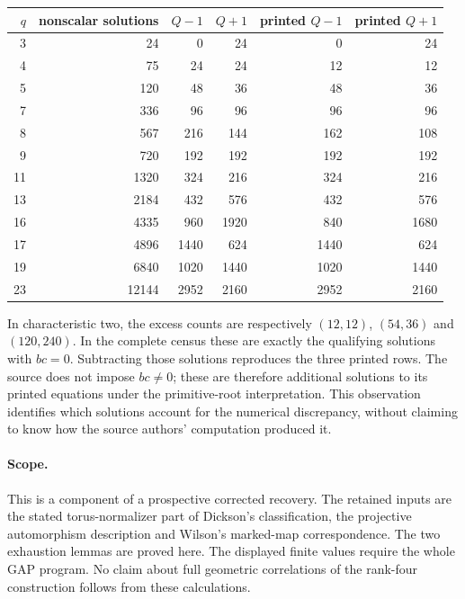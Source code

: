 \documentclass[11pt,a4paper]{article}
\begin{document}
\begin{center}
\begin{tabular}{rrrrrr}
\toprule
$q$&nonscalar solutions&$Q-1$&$Q+1$&printed $Q-1$&printed $Q+1$\\
\midrule
3&24&0&24&0&24\\
4&75&24&24&12&12\\
5&120&48&36&48&36\\
7&336&96&96&96&96\\
8&567&216&144&162&108\\
9&720&192&192&192&192\\
11&1320&324&216&324&216\\
13&2184&432&576&432&576\\
16&4335&960&1920&840&1680\\
17&4896&1440&624&1440&624\\
19&6840&1020&1440&1020&1440\\
23&12144&2952&2160&2952&2160\\
\bottomrule
\end{tabular}
\end{center}
In characteristic two, the excess counts are respectively $(12,12)$,
$(54,36)$ and $(120,240)$. In the complete census these are exactly
the qualifying solutions with $bc=0$. Subtracting those solutions
reproduces the three printed rows. The source does not impose $bc\ne0$;
these are therefore additional solutions to its printed equations under
the primitive-root interpretation. This observation identifies which
solutions account for the numerical discrepancy, without claiming to know
how the source authors' computation produced it.

\paragraph{Scope.}
This is a component of a prospective corrected recovery. The retained
inputs are the stated torus-normalizer part of Dickson's classification,
the projective automorphism description and Wilson's marked-map
correspondence. The two exhaustion lemmas are proved here. The displayed
finite values require the whole GAP program. No claim about full geometric
correlations of the rank-four construction follows from these calculations.
\end{document}
